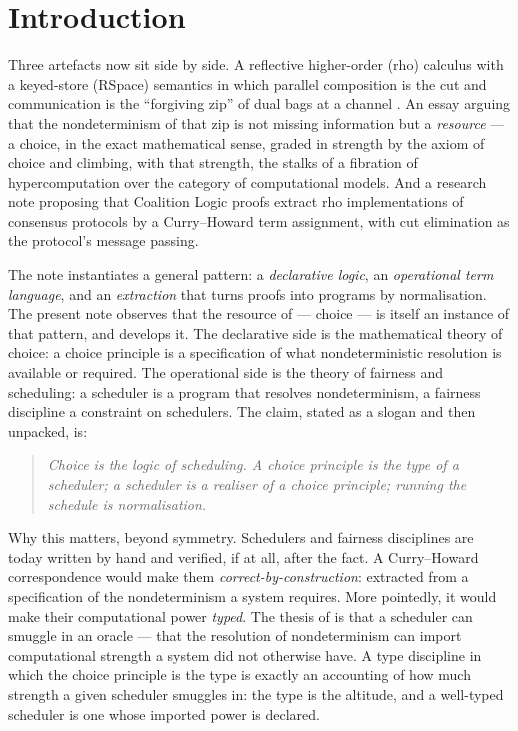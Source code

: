 \documentclass[11pt]{article}
\theoremstyle{definition}
\theoremstyle{plain}
\theoremstyle{remark}
\begin{document}
\section{Introduction}

Three artefacts now sit side by side. A reflective higher-order (rho) calculus \cite{Mer05}
with a keyed-store (RSpace) semantics in which parallel composition is the cut and
communication is the ``forgiving zip'' of dual bags at a channel \cite{qcs,paths}. An essay
\cite{agency} arguing that the nondeterminism of that zip is not missing information but a
\emph{resource} --- a choice, in the exact mathematical sense, graded in strength by the
axiom of choice and climbing, with that strength, the stalks of a fibration of
hypercomputation over the category of computational models. And a research note \cite{consensus}
proposing that Coalition Logic proofs extract rho implementations of consensus protocols by a
Curry--Howard term assignment, with cut elimination as the protocol's message passing.

The note \cite{consensus} instantiates a general pattern: a \emph{declarative logic}, an
\emph{operational term language}, and an \emph{extraction} that turns proofs into programs by
normalisation. The present note observes that the resource of \cite{agency} --- choice --- is
itself an instance of that pattern, and develops it. The declarative side is the mathematical
theory of choice: a choice principle is a specification of what nondeterministic resolution is
available or required. The operational side is the theory of fairness and scheduling: a
scheduler is a program that resolves nondeterminism, a fairness discipline a constraint on
schedulers. The claim, stated as a slogan and then unpacked, is:
\begin{quote}
\emph{Choice is the logic of scheduling. A choice principle is the type of a scheduler; a
scheduler is a realiser of a choice principle; running the schedule is normalisation.}
\end{quote}
Why this matters, beyond symmetry. Schedulers and fairness disciplines are today written by
hand and verified, if at all, after the fact. A Curry--Howard correspondence would make them
\emph{correct-by-construction}: extracted from a specification of the nondeterminism a system
requires. More pointedly, it would make their computational power \emph{typed}. The thesis of
\cite{agency} is that a scheduler can smuggle in an oracle --- that the resolution of
nondeterminism can import computational strength a system did not otherwise have. A type
discipline in which the choice principle is the type is exactly an accounting of how much
strength a given scheduler smuggles in: the type is the altitude, and a well-typed scheduler
is one whose imported power is declared.
\end{document}
